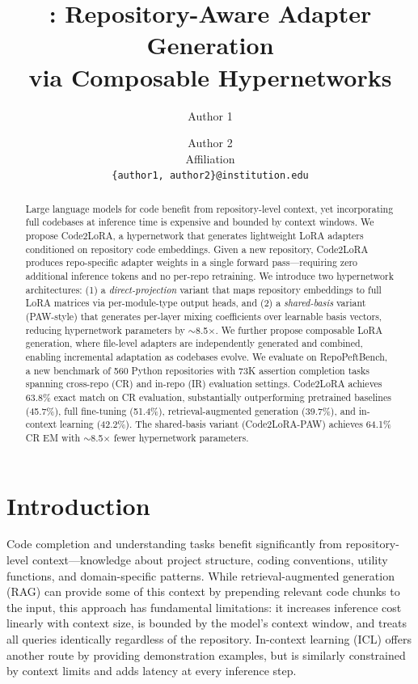 \documentclass[11pt]{article}
\title{\method{}: Repository-Aware Adapter Generation\\via Composable Hypernetworks}
\author{
  Author 1 \and Author 2 \\
  Affiliation \\
  \texttt{\{author1, author2\}@institution.edu}
}
\newcommand{\method}{Code2LoRA}
\newcommand{\benchmark}{RepoPeftBench}
\begin{document}
\maketitle

\begin{abstract}

Large language models for code benefit from repository-level context, yet incorporating full codebases at inference time is expensive and bounded by context windows.
We propose \method{}, a hypernetwork that generates lightweight LoRA adapters conditioned on repository code embeddings.
Given a new repository, \method{} produces repo-specific adapter weights in a single forward pass---requiring zero additional inference tokens and no per-repo retraining.
We introduce two hypernetwork architectures:
(1) a \emph{direct-projection} variant that maps repository embeddings to full LoRA matrices via per-module-type output heads, and
(2) a \emph{shared-basis} variant (PAW-style) that generates per-layer mixing coefficients over learnable basis vectors, reducing hypernetwork parameters by $\sim$8.5$\times$.
We further propose composable LoRA generation, where file-level adapters are independently generated and combined, enabling incremental adaptation as codebases evolve.
We evaluate on \benchmark{}, a new benchmark of 560 Python repositories with 73K assertion completion tasks spanning cross-repo (CR) and in-repo (IR) evaluation settings.
\method{} achieves 63.8\% exact match on CR evaluation, substantially outperforming pretrained baselines (45.7\%), full fine-tuning (51.4\%), retrieval-augmented generation (39.7\%), and in-context learning (42.2\%).
The shared-basis variant (\method{}-PAW) achieves 64.1\% CR EM with $\sim$8.5$\times$ fewer hypernetwork parameters.

\end{abstract}

\section{Introduction}
\label{sec:intro}

Code completion and understanding tasks benefit significantly from repository-level context---knowledge about project structure, coding conventions, utility functions, and domain-specific patterns.
While retrieval-augmented generation (RAG) can provide some of this context by prepending relevant code chunks to the input, this approach has fundamental limitations: it increases inference cost linearly with context size, is bounded by the model's context window, and treats all queries identically regardless of the repository.
In-context learning (ICL) offers another route by providing demonstration examples, but is similarly constrained by context limits and adds latency at every inference step.
\end{document}
